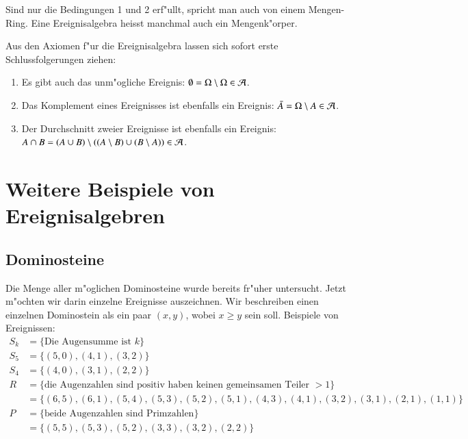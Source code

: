 Sind nur die Bedingungen 1 und 2 erf"ullt, spricht man auch von einem
Mengen-Ring.
Eine Ereignisalgebra heisst manchmal auch ein Mengenk"orper.

Aus den Axiomen f"ur die Ereignisalgebra lassen sich sofort erste
Schlussfolgerungen ziehen:
\begin{enumerate}
\item Es gibt auch das unm"ogliche Ereignis: $\emptyset = \Omega\setminus\Omega\in{\cal A}$.
\item Das Komplement eines Ereignisses ist ebenfalls ein Ereignis: $\bar A=\Omega\setminus A\in{\cal A}$.
\item Der Durchschnitt zweier Ereignisse ist ebenfalls ein Ereignis: $A\cap B = 
(A\cup B) \setminus ((A\setminus B) \cup (B\setminus A))\in{\cal A}$.
\end{enumerate}

\section{Weitere Beispiele von Ereignisalgebren} \label{section-beispiele}
\subsection{Dominosteine}
Die Menge aller m"oglichen Dominosteine wurde bereits fr"uher untersucht.
Jetzt m"ochten wir darin einzelne Ereignisse auszeichnen.
Wir beschreiben
einen einzelnen Dominostein als ein paar $(x,y)$, wobei $x\ge y$ sein soll.
Beispiele von Ereignissen:
\begin{align*}
S_k&=\{ \text{Die Augensumme ist $k$}\}\\
S_5&=\{ (5,0), (4,1), (3,2) \}\\
S_4&=\{ (4,0), (3,1), (2,2) \}\\
R&=\{\text{die Augenzahlen sind positiv haben keinen gemeinsamen Teiler $>1$}\}\\
 &=\{ (6,5), (6,1), (5,4), (5,3), (5,2), (5,1), (4,3), (4,1), (3,2), (3,1), (2,1), (1,1) \}
\\
P&=\{\text{beide Augenzahlen sind Primzahlen}\}\\
 &=\{(5,5), (5,3), (5,2), (3,3), (3,2), (2,2) \}\\
\end{align*}

